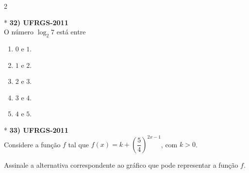 \documentclass[11pt,a4paper]{article}
\begin{document}
\begin{paracol}{2}
\switchcolumn[1]
\vspace{7cm}

\switchcolumn[0]*
\textbf{32) UFRGS-2011} \\
O número $\log_2 7$ está entre

\begin{enumerate}[label=(\Alph*)]
    \item $0 \text{ e } 1$.
    \item $1 \text{ e } 2$.
    \item $2 \text{ e } 3$.
    \item $3 \text{ e } 4$.
    \item $4 \text{ e } 5$.
\end{enumerate}
\vspace{0.4cm}

\switchcolumn[1]
\vspace{6cm}

\switchcolumn[0]*
\textbf{33) UFRGS-2011} \\
Considere a função $f$ tal que $f(x) = k + \left(\dfrac{5}{4}\right)^{2x-1}$, com $k > 0$.

Assinale a alternativa correspondente ao gráfico que pode representar a função $f$.


\end{paracol}
\end{document}

